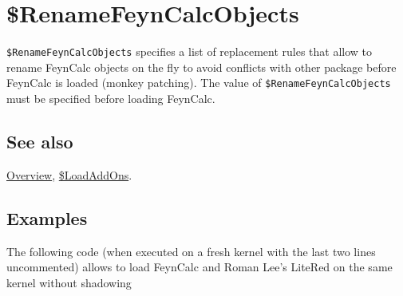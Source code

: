 \documentclass[../FeynCalcManual.tex]{subfiles}
\begin{document}
\hypertarget{renamefeyncalcobjects}{%
\section{\$RenameFeynCalcObjects}\label{renamefeyncalcobjects}}

\texttt{\$RenameFeynCalcObjects} specifies a list of replacement rules
that allow to rename FeynCalc objects on the fly to avoid conflicts with
other package before FeynCalc is loaded (monkey patching). The value of
\texttt{\$RenameFeynCalcObjects} must be specified before loading
FeynCalc.

\subsection{See also}

\hyperlink{toc}{Overview}, \hyperlink{loadaddons}{\$LoadAddOns}.

\subsection{Examples}

The following code (when executed on a fresh kernel with the last two
lines uncommented) allows to load FeynCalc and Roman Lee's LiteRed on
the same kernel without shadowing

\begin{Shaded}
\begin{Highlighting}[]
\ExtensionTok{=} \OperatorTok{\{} \OtherTok{{-}\textgreater{}} \OperatorTok{,}  \OtherTok{{-}\textgreater{}} \OperatorTok{,}  \OtherTok{{-}\textgreater{}} \OperatorTok{\}}\NormalTok{;}
\CommentTok{(*}
\CommentTok{*)}
\end{Highlighting}
\end{Shaded}
\end{document}
